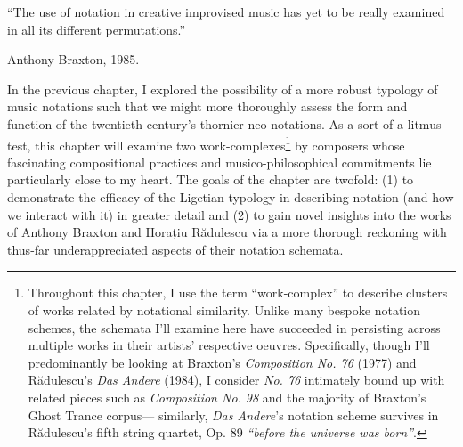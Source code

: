 
\epigraph{\singlespacing ``The use of notation in creative improvised music has yet to be really examined in all its different permutations.''}{Anthony Braxton, 1985.}



    In the previous chapter, I explored the possibility of a more robust typology of music notations such that we might more thoroughly assess the form and function of the twentieth century's thornier neo-notations. As a sort of a litmus test, this chapter will examine two work-complexes\footnote{Throughout this chapter, I use the term ``work-complex'' to describe clusters of works related by notational similarity. Unlike many bespoke notation schemes, the schemata I'll examine here have succeeded in persisting across multiple works in their artists' respective oeuvres. Specifically, though I'll predominantly be looking at Braxton's \textit{Composition No. 76} (1977) and Rădulescu's \textit{Das Andere} (1984), I consider \textit{No. 76} intimately bound up with related pieces such as \textit{Composition No. 98} and the majority of Braxton's Ghost Trance corpus--- similarly, \textit{Das Andere}'s notation scheme survives in Rădulescu's fifth string quartet, Op. 89 \textit{``before the universe was born''}.} by composers whose fascinating compositional practices and musico-philosophical commitments lie particularly close to my heart. The goals of the chapter are twofold: (1) to demonstrate the efficacy of the Ligetian typology in describing notation (and how we interact with it) in greater detail and (2) to gain novel insights into the works of Anthony Braxton and Horațiu Rădulescu via a more thorough reckoning with thus-far underappreciated aspects of their notation schemata.


